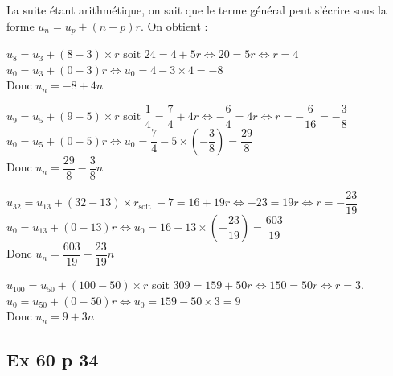 \documentclass[a4paper,french]{book}
\begin{document}
La suite étant arithmétique, on sait que le terme général peut s'écrire sous la forme $u_{n}=u_{p}+(n-p) r$. On obtient :
\begin{enumMet}
    \item $u_{8}=u_{3}+(8-3) \times r \text { soit } 24=4+5 r \Longleftrightarrow 20=5 r \Longleftrightarrow r=4$ \\
    $u_{0}=u_{3}+(0-3) r \Longleftrightarrow u_{0}=4-3 \times 4=-8$ \\
    Donc $u_{n}=-8+4 n$
    \item $u_{9}=u_{5}+(9-5) \times r \text { soit } \dfrac{1}{4}=\dfrac{7}{4}+4 r \Longleftrightarrow-\dfrac{6}{4}=4 r \Longleftrightarrow r=-\dfrac{6}{16}=-\dfrac{3}{8}$\\
    $u_{0}=u_{5}+(0-5) r \Longleftrightarrow u_{0}=\dfrac{7}{4}-5 \times\left(-\dfrac{3}{8}\right)=\dfrac{29}{8}$ \\
    Donc $u_{n}=\dfrac{29}{8}-\dfrac{3}{8} n$ \\
    \item $u_{32}=u_{13}+(32-13) \times r_{\text {soit }}-7=16+19 r \Longleftrightarrow-23=19 r \Longleftrightarrow r=-\dfrac{23}{19}$\\
    $u_{0}=u_{13}+(0-13) r \Longleftrightarrow u_{0}=16-13 \times\left(-\dfrac{23}{19}\right)=\dfrac{603}{19}$\\
    Donc $u_{n}=\dfrac{603}{19}-\dfrac{23}{19} n$
    \item $u_{100}=u_{50}+(100-50) \times r$ soit $309=159+50 r \Longleftrightarrow 150=50 r \Longleftrightarrow r=3$.\\
    $u_{0}=u_{50}+(0-50) r \Longleftrightarrow u_{0}=159-50 \times 3=9$ \\
    Donc $u_{n}=9+3 n$

\end{enumMet}

\subsection*{Ex 60 p 34}
\end{document}
